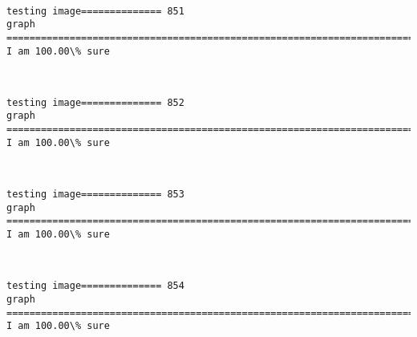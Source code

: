 \documentclass[11pt]{article}
\begin{document}
    \begin{center}
    \end{center}
    { \hspace*{\fill} \\}
    
    \begin{Verbatim}[commandchars=\\\{\}]
testing image============== 851
graph
============================================================================
I am 100.00\% sure

    \end{Verbatim}

    \begin{center}
    \end{center}
    { \hspace*{\fill} \\}
    
    \begin{Verbatim}[commandchars=\\\{\}]
testing image============== 852
graph
============================================================================
I am 100.00\% sure

    \end{Verbatim}

    \begin{center}
    \end{center}
    { \hspace*{\fill} \\}
    
    \begin{Verbatim}[commandchars=\\\{\}]
testing image============== 853
graph
============================================================================
I am 100.00\% sure

    \end{Verbatim}

    \begin{center}
    \end{center}
    { \hspace*{\fill} \\}
    
    \begin{Verbatim}[commandchars=\\\{\}]
testing image============== 854
graph
============================================================================
I am 100.00\% sure

    \end{Verbatim}
\end{document}
